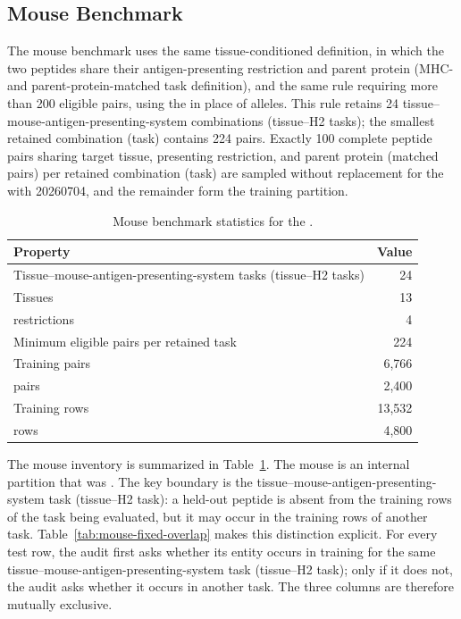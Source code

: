 \subsection{Mouse Benchmark}

The mouse benchmark uses the same tissue-conditioned definition, in which the two peptides share their antigen-presenting restriction and parent protein (MHC- and parent-protein-matched task definition), and the same rule requiring more than 200 eligible pairs, using the \plainHtwo{} in place of \plainHLA{} alleles. This rule retains 24 tissue--mouse-antigen-presenting-system combinations (tissue--H2 tasks); the smallest retained combination (task) contains 224 pairs. Exactly 100 complete peptide pairs sharing target tissue, presenting restriction, and parent protein (matched pairs) per retained combination (task) are sampled without replacement for the \plainFixedTest{} with \plainSplitSeed{} 20260704, and the remainder form the training partition.

\begin{table}[tbp]
\centering
\caption{Mouse benchmark statistics for the \plainFixedTest{}.}
\label{tab:mouse-benchmark-stats}
\small
\begin{tabular}{lr}
\toprule
Property & Value \\
\midrule
Tissue--mouse-antigen-presenting-system tasks (tissue--H2 tasks) & 24 \\
Tissues & 13 \\
\plainHtwo{} restrictions & 4 \\
Minimum eligible pairs per retained task & 224 \\
Training pairs & 6,766 \\
\plainFixedTest{} pairs & 2,400 \\
Training rows & 13,532 \\
\plainFixedTest{} rows & 4,800 \\
\bottomrule
\end{tabular}
\end{table}

The mouse inventory is summarized in Table~\ref{tab:mouse-benchmark-stats}. The mouse \plainFixedTest{} is an internal partition that was \plainFrozen{}. The key boundary is the tissue--mouse-antigen-presenting-system task (tissue--H2 task): a held-out peptide is absent from the training rows of the task being evaluated, but it may occur in the training rows of another task. Table~\ref{tab:mouse-fixed-overlap} makes this distinction explicit. For every test row, the audit first asks whether its entity occurs in training for the same tissue--mouse-antigen-presenting-system task (tissue--H2 task); only if it does not, the audit asks whether it occurs in another task. The three columns are therefore mutually exclusive.

